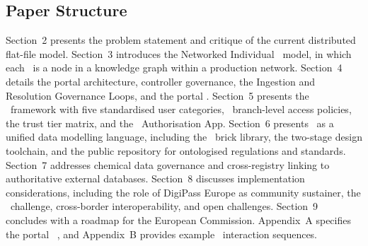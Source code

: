 \subsection{Paper Structure}

Section~2 presents the problem statement and critique of the current distributed
flat-file model. Section~3 introduces the Networked Individual \DPP\ model, in
which each \DPP\ is a node in a knowledge graph within a production network.
Section~4 details the portal architecture, controller governance, the Ingestion
and Resolution Governance Loops, and the portal \API. Section~5 presents the
\ABAC\ framework with five standardised user categories, \ODRL\ branch-level
access policies, the trust tier matrix, and the \EC\ Authorisation App.
Section~6 presents \SHACL\ as a unified data modelling language, including the
\SHACL\ brick library, the two-stage design toolchain, and the public repository
for ontologised regulations and standards. Section~7 addresses chemical data
governance and cross-registry linking to authoritative external databases.
Section~8 discusses implementation considerations, including the role of
DigiPass Europe as community sustainer, the \SME\ challenge, cross-border
interoperability, and open challenges. Section~9 concludes with a roadmap for
the European Commission. Appendix~A specifies the portal \REST\ \API, and
Appendix~B provides example \API\ interaction sequences.
